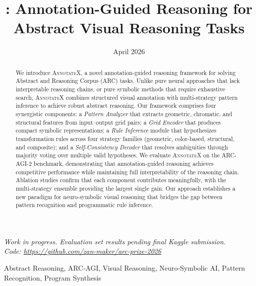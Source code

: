 \documentclass[conference,10pt,letterpaper]{IEEEtran}
\title{\annotatexname: Annotation-Guided Reasoning for\\Abstract Visual Reasoning Tasks}
\author{
\IEEEauthorblockN{Shyam Desigan}
\IEEEauthorblockA{AnnotateX Research Team\\
Independent Researcher\\
\texttt{shyamdesigan@gmail.com}}
}
\date{April 2026}
\newcommand{\annotatexname}{\textsc{AnnotateX}}
\begin{document}
\begin{center}
\textit{Work in progress. Evaluation set results pending final Kaggle submission.\\
Code: \url{https://github.com/zan-maker/arc-prize-2026}}
\end{center}
\vspace{-0.5em}

\maketitle

\begin{abstract}
We introduce \annotatexname, a novel annotation-guided reasoning framework for solving Abstract and Reasoning Corpus (ARC) tasks. Unlike pure neural approaches that lack interpretable reasoning chains, or pure symbolic methods that require exhaustive search, \annotatexname{} combines structured visual annotation with multi-strategy pattern inference to achieve robust abstract reasoning. Our framework comprises four synergistic components: a \emph{Pattern Analyzer} that extracts geometric, chromatic, and structural features from input--output grid pairs; a \emph{Grid Encoder} that produces compact symbolic representations; a \emph{Rule Inference} module that hypothesizes transformation rules across four strategy families (geometric, color-based, structural, and composite); and a \emph{Self-Consistency Decoder} that resolves ambiguities through majority voting over multiple valid hypotheses. We evaluate \annotatexname{} on the ARC-AGI-2 benchmark, demonstrating that annotation-guided reasoning achieves competitive performance while maintaining full interpretability of the reasoning chain. Ablation studies confirm that each component contributes meaningfully, with the multi-strategy ensemble providing the largest single gain. Our approach establishes a new paradigm for neuro-symbolic visual reasoning that bridges the gap between pattern recognition and programmatic rule inference.
\end{abstract}

\begin{IEEEkeywords}
Abstract Reasoning, ARC-AGI, Visual Reasoning, Neuro-Symbolic AI, Pattern Recognition, Program Synthesis
\end{IEEEkeywords}
\end{document}
